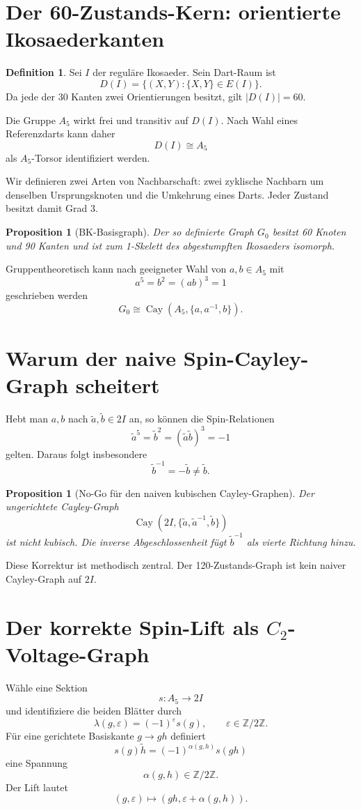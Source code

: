 \documentclass[11pt,a4paper]{article}
\newtheorem{proposition}[theorem]{Proposition}
\theoremstyle{definition}
\newtheorem{definition}[theorem]{Definition}
\theoremstyle{remark}
\newcommand{\ZZ}{\mathbb Z}
\begin{document}
\section{Der 60-Zustands-Kern: orientierte Ikosaederkanten}
\begin{definition}
Sei $I$ der reguläre Ikosaeder. Sein Dart-Raum ist
\[
D(I)=\{(X,Y):\{X,Y\}\in E(I)\}.
\]
Da jede der 30 Kanten zwei Orientierungen besitzt, gilt $|D(I)|=60$.
\end{definition}

Die Gruppe $A_5$ wirkt frei und transitiv auf $D(I)$. Nach Wahl eines Referenzdarts kann daher
\[
D(I)\cong A_5
\]
als $A_5$-Torsor identifiziert werden.

Wir definieren zwei Arten von Nachbarschaft: zwei zyklische Nachbarn um denselben Ursprungsknoten und die Umkehrung eines Darts. Jeder Zustand besitzt damit Grad $3$.

\begin{proposition}[BK-Basisgraph]
Der so definierte Graph $G_0$ besitzt 60 Knoten und 90 Kanten und ist zum 1-Skelett des abgestumpften Ikosaeders isomorph.
\end{proposition}

Gruppentheoretisch kann nach geeigneter Wahl von $a,b\in A_5$ mit
\[
a^5=b^2=(ab)^3=1
\]
geschrieben werden
\[
G_0\cong\operatorname{Cay}\!\left(A_5,\{a,a^{-1},b\}\right).
\]

\section{Warum der naive Spin-Cayley-Graph scheitert}
Hebt man $a,b$ nach $\tilde a,\tilde b\in2I$ an, so können die Spin-Relationen
\[
\tilde a^5=\tilde b^2=(\tilde a\tilde b)^3=-1
\]
gelten. Daraus folgt insbesondere
\[
\tilde b^{-1}=-\tilde b\neq\tilde b.
\]

\begin{proposition}[No-Go für den naiven kubischen Cayley-Graphen]
Der ungerichtete Cayley-Graph
\[
\operatorname{Cay}\!\left(2I,\{\tilde a,\tilde a^{-1},\tilde b\}\right)
\]
ist nicht kubisch. Die inverse Abgeschlossenheit fügt $\tilde b^{-1}$ als vierte Richtung hinzu.
\end{proposition}

Diese Korrektur ist methodisch zentral. Der 120-Zustands-Graph ist kein naiver Cayley-Graph auf $2I$.

\section{Der korrekte Spin-Lift als $C_2$-Voltage-Graph}
Wähle eine Sektion
\[
s:A_5\to2I
\]
und identifiziere die beiden Blätter durch
\[
\lambda(g,\varepsilon)=(-1)^\varepsilon s(g),
\qquad \varepsilon\in\ZZ/2\ZZ.
\]
Für eine gerichtete Basiskante $g\to gh$ definiert
\[
s(g)\tilde h=(-1)^{\alpha(g,h)}s(gh)
\]
eine Spannung
\[
\alpha(g,h)\in\ZZ/2\ZZ.
\]
Der Lift lautet
\[
(g,\varepsilon)\longmapsto
(gh,\varepsilon+\alpha(g,h)).
\]
\end{document}
